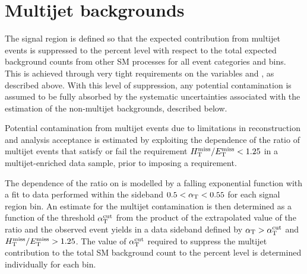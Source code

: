 \section{Multijet backgrounds}
\label{sec:qcd_background}

The signal region is defined so that the expected contribution from
multijet events is suppressed to the percent level with respect to
the total expected background counts from other SM processes for all
event categories and \scalht bins. This is achieved through very tight
requirements on the variables \alphat and \dphi, as described
above. With this level of suppression, any potential contamination is
assumed to be fully absorbed by the systematic uncertainties
associated with the estimation of the non-multijet backgrounds,
described below.

Potential contamination from multijet events due to 
limitations in reconstruction and analysis acceptance is estimated 
by exploiting the \alphat dependence of the ratio of multijet events 
that satisfy or fail the requirement $\mhtmet < 1.25$ in a
multijet-enriched data sample, prior to imposing a \dphi requirement.

The dependence of the ratio on \alphat is modelled by a falling
exponential function with a fit to data performed within the sideband 
$0.5 < \alphat < 0.55$ for each signal region bin. An estimate for the multijet
contamination is then determined as a function of the threshold
$\alphat^{\rm cut}$ from the product of the extrapolated value of the
ratio and the observed event yields in a data sideband defined by
$\alphat > \alphat^{\rm cut}$ and $\mhtmet > 1.25$. The value of
$\alphat^{\rm cut}$ required to suppress the multijet contribution to
the total SM background count to the percent level is determined
individually for each \scalht bin.
%

